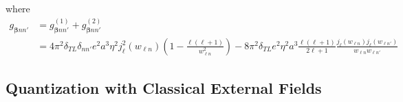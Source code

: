\documentclass{article}
\begin{document}
where
\begin{equation}
\begin{split}
g_{\bm{\beta}nn'} &= g_{\bm{\beta}nn'}^{(1)} + g_{\bm{\beta}nn'}^{(2)}\\
&= 4\pi^2\delta_{TL}\delta_{nn'}e^2a^3\eta^2j_\ell^2(w_{\ell n})\left(1 - \frac{\ell(\ell + 1)}{w_{\ell n}^2}\right) - 8\pi^2\delta_{TL}e^2\eta^2a^3\frac{\ell(\ell + 1)}{2\ell + 1}\frac{j_\ell(w_{\ell n})j_\ell(w_{\ell n'})}{w_{\ell n}w_{\ell n'}}
\end{split}
\end{equation}

















\subsection{Quantization with Classical External Fields}\label{sec:quantization}
\end{document}

